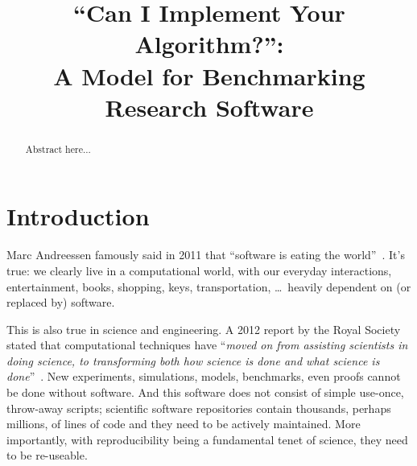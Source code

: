\documentclass[conference]{IEEEtran}
\begin{document}

\title{``Can I Implement Your Algorithm?'':\\ A Model for Benchmarking Research Software}

\author{
\and
{}
\and
{}
 }

\maketitle

\begin{abstract}
Abstract here...
\end{abstract}

\IEEEpeerreviewmaketitle

\section{Introduction}

Marc Andreessen famously said in 2011 that ``software is eating the
world''~\cite{andreessen:2011}. It's true: we clearly live in a
computational world, with our everyday interactions, entertainment,
books, shopping, keys, transportation, \dots\ heavily dependent on (or
replaced by) software.

This is also true in science and engineering. A 2012 report by the
Royal Society stated that computational techniques have ``{\emph{moved
on from assisting scientists in doing science, to transforming both
how science is done and what science is
done}}''~\cite{rssaaoe:2012}. New experiments, simulations, models,
benchmarks, even proofs cannot be done without software. And this
software does not consist of simple use-once, throw-away scripts;
scientific software repositories contain thousands, perhaps millions,
of lines of code and they need to be actively maintained. More
importantly, with reproducibility being a fundamental tenet of
science, they need to be re-useable.
\end{document}

